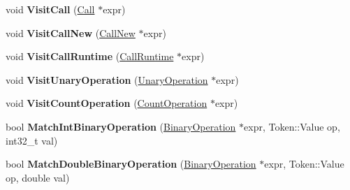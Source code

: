 \begin{DoxyCompactItemize}
\item 
void {\bfseries Visit\+Call} (\hyperlink{classv8_1_1internal_1_1_call}{Call} $\ast$expr)\hypertarget{classv8_1_1internal_1_1wasm_1_1_asm_wasm_builder_impl_a09e6e294550dcef31c7216080f8089c2}{}\label{classv8_1_1internal_1_1wasm_1_1_asm_wasm_builder_impl_a09e6e294550dcef31c7216080f8089c2}

\item 
void {\bfseries Visit\+Call\+New} (\hyperlink{classv8_1_1internal_1_1_call_new}{Call\+New} $\ast$expr)\hypertarget{classv8_1_1internal_1_1wasm_1_1_asm_wasm_builder_impl_ae704931569eb70e9e41c45f9812bce37}{}\label{classv8_1_1internal_1_1wasm_1_1_asm_wasm_builder_impl_ae704931569eb70e9e41c45f9812bce37}

\item 
void {\bfseries Visit\+Call\+Runtime} (\hyperlink{classv8_1_1internal_1_1_call_runtime}{Call\+Runtime} $\ast$expr)\hypertarget{classv8_1_1internal_1_1wasm_1_1_asm_wasm_builder_impl_a2cd6b4cb7f178d38e745a6ef79470319}{}\label{classv8_1_1internal_1_1wasm_1_1_asm_wasm_builder_impl_a2cd6b4cb7f178d38e745a6ef79470319}

\item 
void {\bfseries Visit\+Unary\+Operation} (\hyperlink{classv8_1_1internal_1_1_unary_operation}{Unary\+Operation} $\ast$expr)\hypertarget{classv8_1_1internal_1_1wasm_1_1_asm_wasm_builder_impl_aedda2dfd587a8a02936512e37a8f849c}{}\label{classv8_1_1internal_1_1wasm_1_1_asm_wasm_builder_impl_aedda2dfd587a8a02936512e37a8f849c}

\item 
void {\bfseries Visit\+Count\+Operation} (\hyperlink{classv8_1_1internal_1_1_count_operation}{Count\+Operation} $\ast$expr)\hypertarget{classv8_1_1internal_1_1wasm_1_1_asm_wasm_builder_impl_a6d3f7766944b983ca8698cf3757c5fe9}{}\label{classv8_1_1internal_1_1wasm_1_1_asm_wasm_builder_impl_a6d3f7766944b983ca8698cf3757c5fe9}

\item 
bool {\bfseries Match\+Int\+Binary\+Operation} (\hyperlink{classv8_1_1internal_1_1_binary_operation}{Binary\+Operation} $\ast$expr, Token\+::\+Value op, int32\+\_\+t val)\hypertarget{classv8_1_1internal_1_1wasm_1_1_asm_wasm_builder_impl_a99a0b62fd1fbae4004bc8410e54e0d29}{}\label{classv8_1_1internal_1_1wasm_1_1_asm_wasm_builder_impl_a99a0b62fd1fbae4004bc8410e54e0d29}

\item 
bool {\bfseries Match\+Double\+Binary\+Operation} (\hyperlink{classv8_1_1internal_1_1_binary_operation}{Binary\+Operation} $\ast$expr, Token\+::\+Value op, double val)\hypertarget{classv8_1_1internal_1_1wasm_1_1_asm_wasm_builder_impl_a64c016153c82f37b9129e8358e692dc1}{}\label{classv8_1_1internal_1_1wasm_1_1_asm_wasm_builder_impl_a64c016153c82f37b9129e8358e692dc1}


\end{DoxyCompactItemize}
